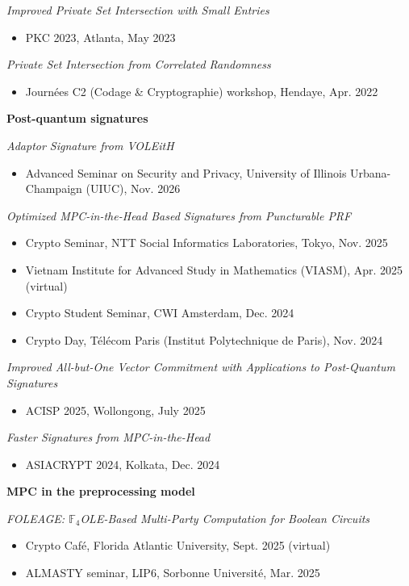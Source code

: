 \documentclass[11pt]{article}
\begin{document}
\smallskip
\emph{Improved Private Set Intersection with Small Entries}
\begin{itemize}
      \item PKC 2023, Atlanta, May 2023
\end{itemize}

\smallskip
\emph{Private Set Intersection from Correlated Randomness}
\begin{itemize}
      \item Journ\'ees C2 (Codage \& Cryptographie) workshop, Hendaye, Apr. 2022
\end{itemize}

\medskip
\textbf{Post-quantum signatures}

\smallskip
\emph{Adaptor Signature from VOLEitH}
\begin{itemize}
      \item Advanced Seminar on Security and Privacy, University of Illinois Urbana-Champaign (UIUC), Nov. 2026
\end{itemize}

\smallskip
\emph{Optimized MPC-in-the-Head Based Signatures from Puncturable PRF}
\begin{itemize}
      \item Crypto Seminar, NTT Social Informatics Laboratories, Tokyo, Nov. 2025
      \item Vietnam Institute for Advanced Study in Mathematics (VIASM), Apr. 2025 (virtual)
      \item Crypto Student Seminar, CWI Amsterdam, Dec. 2024
      \item Crypto Day, T\'el\'ecom Paris (Institut Polytechnique de Paris), Nov. 2024
\end{itemize}

\smallskip
\emph{Improved All-but-One Vector Commitment with Applications to Post-Quantum Signatures}
\begin{itemize}
      \item ACISP 2025, Wollongong, July 2025
\end{itemize}

\smallskip
\emph{Faster Signatures from MPC-in-the-Head}
\begin{itemize}
      \item ASIACRYPT 2024, Kolkata, Dec. 2024
\end{itemize}

\medskip
\textbf{MPC in the preprocessing model}

\smallskip
\emph{FOLEAGE: $\mathbb{F}_4$OLE-Based Multi-Party Computation for Boolean Circuits}
\begin{itemize}
      \item Crypto Caf\'e, Florida Atlantic University, Sept. 2025 (virtual)
      \item ALMASTY seminar, LIP6, Sorbonne Universit\'e, Mar. 2025
\end{itemize}
\end{document}
